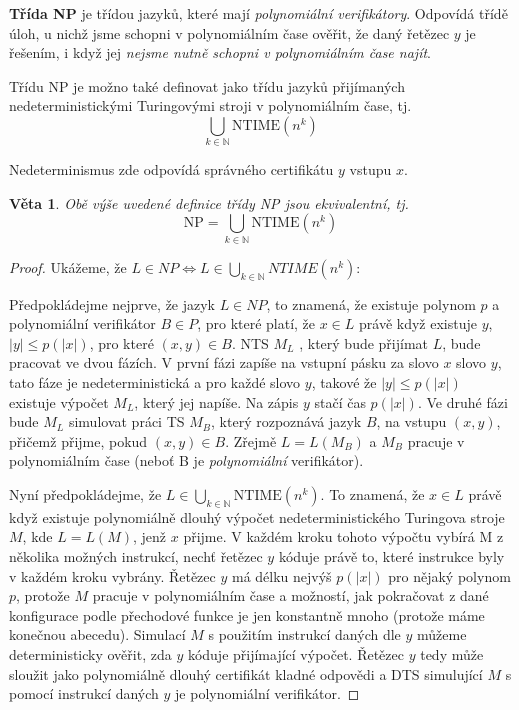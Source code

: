 \documentclass[11pt]{report} %
\newcommand{\N}{\mathbb{N}}
\newtheorem{theorem}{Věta}[section]
\numberwithin{equation}{section}
\begin{document}
\textbf{Třída NP} je třídou jazyků, které mají \textit{polynomiální verifikátory}. Odpovídá třídě úloh, u nichž jsme schopni v polynomiálním čase ověřit, že daný řetězec $y$ je řešením, i když jej \textit{nejsme nutně schopni v polynomiálním čase najít}.

Třídu NP je možno také definovat jako třídu jazyků přijímaných nedeterministickými Turingovými stroji v polynomiálním čase, tj. 
$$\bigcup_{k\in\N}\text{NTIME}(n^k) $$

Nedeterminismus zde odpovídá  správného certifikátu $y$ vstupu $x$.

\begin{theorem}
Obě výše uvedené definice třídy NP jsou ekvivalentní, tj.
$$\text{NP} = \bigcup_{k\in\N}\text{NTIME}(n^k) $$
\end{theorem}
\begin{proof}
	Ukážeme, že $L \in NP \Leftrightarrow L \in \bigcup_{k\in\N}NTIME(n^k)$:
	
	\uv{$\Rightarrow$} Předpokládejme nejprve, že jazyk $L \in NP$, to znamená, že existuje polynom $p$ a polynomiální verifikátor $B \in P$, pro které platí, že $x \in L$ právě když existuje $y$, $|y| \leq p(|x|)$, pro které $(x, y) \in B$. NTS $M_L$ , který bude přijímat $L$, bude pracovat ve dvou fázích. V první fázi zapíše na vstupní pásku za slovo $x$ slovo $y$, tato fáze je nedeterministická a pro každé slovo $y$, takové že $|y| \leq p(|x|)$ existuje výpočet $M_L$, který jej napíše. Na zápis $y$ stačí čas $p(|x|)$. Ve druhé fázi bude $M_L$ simulovat práci TS $M_B$, který rozpoznává jazyk $B$, na vstupu $(x, y)$, přičemž přijme, pokud $(x, y) \in B$. Zřejmě $L = L(M_B)$ a $M_B$ pracuje v polynomiálním čase (neboť B je \textit{polynomiální} verifikátor).
	
	\uv{$\Leftarrow$} Nyní předpokládejme, že $L \in \bigcup_{k\in\N}\text{NTIME}(n^k)$. To znamená, že $x \in L$ právě když existuje polynomiálně dlouhý výpočet nedeterministického Turingova stroje $M$, kde $L = L(M)$, jenž $x$ přijme. V každém kroku tohoto výpočtu vybírá M z několika možných instrukcí, nechť řetězec $y$ kóduje právě to, které instrukce byly v každém kroku vybrány. Řetězec $y$ má délku nejvýš $p(|x|)$ pro nějaký polynom $p$, protože $M$ pracuje v polynomiálním čase a možností, jak pokračovat z dané konfigurace podle přechodové funkce je jen konstantně mnoho (protože máme konečnou abecedu). Simulací $M$ s použitím instrukcí daných dle $y$ můžeme deterministicky ověřit, zda $y$ kóduje přijímající výpočet. Řetězec $y$ tedy může sloužit jako polynomiálně dlouhý certifikát kladné odpovědi a DTS simulující $M$ s pomocí instrukcí daných $y$ je polynomiální verifikátor.
\end{proof}
\end{document}
